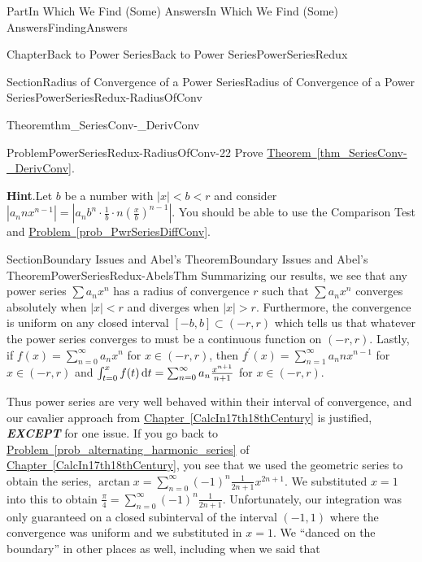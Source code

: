 \documentclass[oneside,10pt,]{book}
\newcommand{\blocktitlefont}{\relax}
\newcommand{\xreffont}{\relax}
\newcommand{\alert}[1]{\textbf{\textit{#1}}}
\numberwithin{equation}{part}
\newcommand{\dx}[1]{\,{\rm d}#1}
\newcommand{\abs}[1]{\left|#1\right|}
\newcommand{\lt}{<}
\begin{document}
\begin{partptx}{Part}{In Which We Find (Some) Answers}{}{In Which We Find (Some) Answers}{}{}{FindingAnswers}
\begin{chapterptx}{Chapter}{Back to Power Series}{}{Back to Power Series}{}{}{PowerSeriesRedux}
\begin{sectionptx}{Section}{Radius of Convergence of a Power Series}{}{Radius of Convergence of a Power Series}{}{}{PowerSeriesRedux-RadiusOfConv}
\begin{theorem}{Theorem}{}{}{thm_SeriesConv-_DerivConv}
\end{theorem}
\begin{problem}{Problem}{}{PowerSeriesRedux-RadiusOfConv-22}%
Prove \hyperref[thm_SeriesConv-_DerivConv]{Theorem~{\xreffont\ref{thm_SeriesConv-_DerivConv}}}.%
\par\smallskip%
\noindent\textbf{\blocktitlefont Hint}.\hypertarget{PowerSeriesRedux-RadiusOfConv-22-3}{}\quad{}Let \(b\) be a number with \(\abs{x}\lt b\lt r\) and consider \(\abs{a_nnx^{n-1}}
=\abs{a_nb^n\cdot\frac{1}{b}\cdot
n\left(\frac{x}{b}\right)^{n-1}}\).  You should be able to use the Comparison Test and \hyperref[prob_PwrSeriesDiffConv]{Problem~{\xreffont\ref{prob_PwrSeriesDiffConv}}}.%
\end{problem}
\end{sectionptx}
%
%
\typeout{************************************************}
\typeout{************************************************}
%
\begin{sectionptx}{Section}{Boundary Issues and Abel's Theorem}{}{Boundary Issues and Abel's Theorem}{}{}{PowerSeriesRedux-AbelsThm}
Summarizing our results, we see that any power series \(\sum
a_nx^n\) has a radius of convergence \(r\) such that \(\sum a_nx^n\) converges absolutely when \(|x|\lt r\) and diverges when \(|x|>r\).  Furthermore, the convergence is uniform on any closed interval \([-b,b]\subset(-r,r)\) which tells us that whatever the power series converges to must be a continuous function on \((-r,r)\).  Lastly, if \(f(x)=\sum_{n=0}^\infty a_nx^n\) for \(x\in(-r,r)\), then \(f^\prime(x)=\sum_{n=1}^\infty a_nnx^{n-1}\) for \(x\in(-r,r)\) and \(\int_{t=0}^xf(t)\dx{ t} =
\sum_{n=0}^\infty a_n\frac{x^{n+1}}{n+1}\) for \(x\in(-r,r)\).%
\par
Thus power series are very well behaved within their interval of convergence, and our cavalier approach from \hyperref[CalcIn17th18thCentury]{Chapter~{\xreffont\ref{CalcIn17th18thCentury}}} is justified, \alert{EXCEPT} for one issue.  If you go back to \hyperref[prob_alternating_harmonic_series]{Problem~{\xreffont\ref{prob_alternating_harmonic_series}}} of \hyperref[CalcIn17th18thCentury]{Chapter~{\xreffont\ref{CalcIn17th18thCentury}}}, you see that we used the geometric series to obtain the series, \(\arctan x
=\sum_{n=0}^\infty(-1)^n\frac{1}{2n+1}x^{2n+1}\).  We substituted \(x=1\) into this to obtain \(\frac{\pi}{4}=\sum_{n=0}^\infty(-1)^n\frac{1}{2n+1}\). Unfortunately, our integration was only guaranteed on a closed subinterval of the interval \((-1,1)\) where the convergence was uniform and we substituted in \(x=1\).  We ``danced on the boundary'' in other places as well, including when we said that%

\end{sectionptx}
\end{chapterptx}
\end{partptx}
\end{document}
